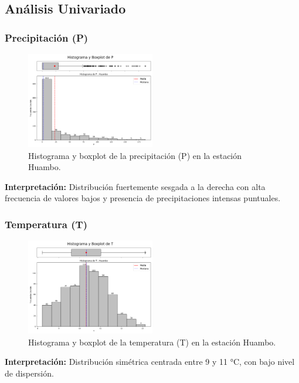 \subsection{Análisis Univariado}

\subsubsection*{Precipitación (P)}
\begin{figure}[H]
\centering
\includegraphics[width=0.5\textwidth]{resultados/por_estacion_meteorologica/Huambo/P_histograma.png}
\caption{Histograma y boxplot de la precipitación (P) en la estación Huambo.}
\label{fig:huambo_P}
\end{figure}
\textbf{Interpretación:} Distribución fuertemente sesgada a la derecha con alta frecuencia de valores bajos y presencia de precipitaciones intensas puntuales.

\subsubsection*{Temperatura (T)}
\begin{figure}[H]
\centering
\includegraphics[width=0.5\textwidth]{resultados/por_estacion_meteorologica/Huambo/T_histograma.png}
\caption{Histograma y boxplot de la temperatura (T) en la estación Huambo.}
\label{fig:huambo_T}
\end{figure}
\textbf{Interpretación:} Distribución simétrica centrada entre 9 y 11 °C, con bajo nivel de dispersión.

